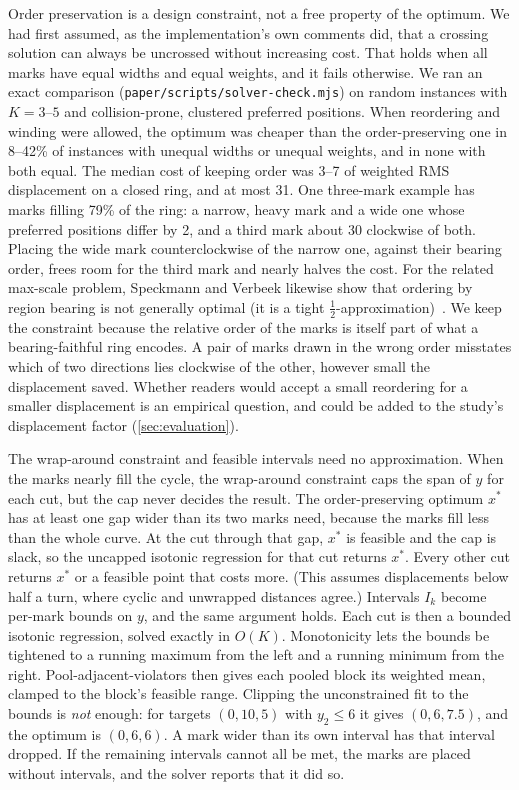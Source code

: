 Order preservation is a design constraint, not a free property of the
optimum. We had first assumed, as the implementation's own comments did, that a
crossing solution can always be uncrossed without increasing cost. That holds
when all marks have equal widths and equal weights, and it fails otherwise. We
ran an exact comparison (\texttt{paper/scripts/solver-check.mjs}) on random
instances with $K = 3$--$5$ and collision-prone, clustered preferred positions.
When reordering and winding were allowed, the optimum was cheaper than the
order-preserving one in 8--42\% of instances with unequal widths or unequal
weights, and in none with both equal. The median cost of keeping order was
3--7\textdegree{} of weighted RMS displacement on a closed ring, and at most
31\textdegree. One three-mark example has marks filling 79\% of the ring: a narrow,
heavy mark and a wide one whose preferred positions differ by 2\textdegree, and
a third mark about 30\textdegree{} clockwise of both. Placing the wide mark
counterclockwise of the narrow one, against their bearing order, frees room for
the third mark and nearly halves the cost. For the related max-scale problem, Speckmann and
Verbeek likewise show that ordering by region bearing is not generally optimal
(it is a tight $\frac12$-approximation)~\cite{speckmann2015algorithms}. We keep
the constraint because the relative order of the marks is itself part of what a
bearing-faithful ring encodes. A pair of marks drawn in the wrong order
misstates which of two directions lies clockwise of the other, however small the
displacement saved. Whether readers would accept a small reordering for a
smaller displacement is an empirical question, and could be added to the
study's displacement factor (\cref{sec:evaluation}).

The wrap-around constraint and feasible intervals need no approximation. When the
marks nearly fill the cycle, the wrap-around constraint caps the span of $y$ for
each cut, but the cap never decides the result. The order-preserving optimum
$x^\ast$ has at least one gap wider than its two marks need, because the marks
fill less than the whole curve. At the cut through that gap, $x^\ast$ is feasible
and the cap is slack, so the uncapped isotonic regression for that cut returns
$x^\ast$. Every other cut returns $x^\ast$ or a feasible point that costs more.
(This assumes displacements below half a turn, where cyclic and unwrapped
distances agree.) Intervals $I_k$ become per-mark bounds on $y$, and the same
argument holds. Each cut is then a bounded isotonic regression, solved exactly in
$O(K)$. Monotonicity lets the bounds be tightened to a running maximum from the
left and a running minimum from the right. Pool-adjacent-violators then gives
each pooled block its weighted mean, clamped to the block's feasible range.
Clipping the unconstrained fit to the bounds is \emph{not} enough: for targets
$(0,10,5)$ with $y_2\le 6$ it gives $(0,6,7.5)$, and the optimum is
$(0,6,6)$. A mark wider than its own interval has that interval dropped. If
the remaining intervals cannot all be met, the marks are placed without
intervals, and the solver reports that it did so.

